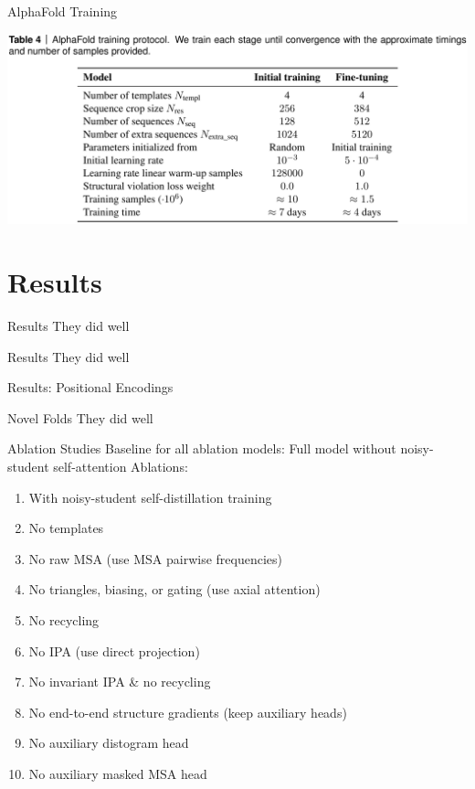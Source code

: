 \documentclass[presentation, smaller]{beamer}
\begin{document}
\begin{frame}[label={sec:org3d7da98}]{AlphaFold Training \cite{jumperHighlyAccurateProtein2021}}
\begin{center}
\includegraphics[width=.9\linewidth]{./imgs/af-training-table.png}
\end{center}
\end{frame}

\section*{Results}
\label{sec:org26fc1f6}
\begin{frame}[label={sec:orgdf093a1}]{Results \cite{jumperHighlyAccurateProtein2021}}
They did well
\end{frame}

\begin{frame}[label={sec:org6d024dd}]{Results \cite{jumperHighlyAccurateProtein2021}}
They did well
\end{frame}

\begin{frame}[label={sec:org3558b44}]{Results: Positional Encodings \cite{jumperHighlyAccurateProtein2021}}
\end{frame}

\begin{frame}[label={sec:org8bfe2c5}]{Novel Folds}
They did well
\end{frame}

\begin{frame}[label={sec:org0309b4b}]{Ablation Studies \cite{jumperHighlyAccurateProtein2021}}
Baseline for all ablation models: Full model without noisy-student self-attention  
Ablations:
\begin{enumerate}
\item With noisy-student self-distillation training
\item No templates
\item No raw MSA (use MSA pairwise frequencies)
\item No triangles, biasing, or gating (use axial attention)
\item No recycling
\item No IPA (use direct projection)
\item No invariant IPA \& no recycling
\item No end-to-end structure gradients (keep auxiliary heads)
\item No auxiliary distogram head
\item No auxiliary masked MSA head
\end{enumerate}
\end{frame}
\end{document}
